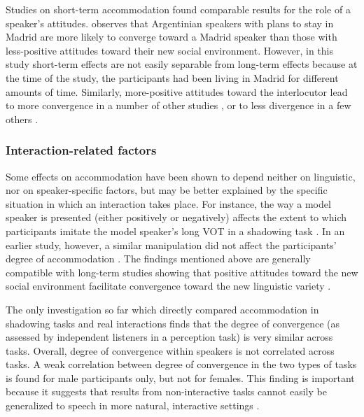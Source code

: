 \documentclass[output=paper,
modfonts
]{langscibook}
\begin{document}
Studies on short-term accommodation found comparable results for the role of a speaker's attitudes. \citet{macleod_effect_2012} observes that Argentinian speakers with plans to stay in Madrid are more likely to converge toward a Madrid speaker than those with less-positive attitudes toward their new social environment. However, in this study short-term effects are not easily separable from long-term effects because at the time of the study, the participants had been living in Madrid for different amounts of time. 
Similarly, more-positive attitudes toward the interlocutor lead to more convergence in a number of other studies \citep{yu_phonetic_2013,schweitzer_convergence_2013,babel_dialect_2010,babel_evidence_2012}, or to less divergence in a few others \citep{schweitzer_social_2014}. 



\subsubsection{Interaction-related factors}

Some effects on accommodation have been shown to depend neither on linguistic, nor on speaker-specific factors, but may be better explained by the specific situation in which an interaction takes place. 
For instance, the way a model speaker is presented (either positively or negatively) affects the extent to which participants imitate the model speaker's long VOT in a shadowing task \citep{yu_phonetic_2013}. In an earlier study, however, a similar manipulation did not affect the participants' degree of accommodation \citep{babel_dialect_2010}. The findings mentioned above are generally compatible with long-term studies showing that  positive attitudes toward the new social environment facilitate convergence toward the new linguistic variety \citep{werlen_zwischen_2006,macleod_effect_2012,pardo_phonetic_2012}.
% 
% 
% 

The only investigation so far which directly compared accommodation in shadowing tasks and real interactions \citep{pardo_comparison_2018} finds that the degree of convergence (as assessed by independent listeners in a perception task) is very similar across tasks. Overall, degree of convergence within speakers is not correlated across tasks. A weak correlation between degree of convergence in the two types of tasks is found for male participants only, but not for females. This finding is important because it suggests that results from non-interactive tasks cannot easily be generalized to speech in more natural, interactive settings \citep{pardo_comparison_2018}. 
% 
% 
% 
% 
% 
% 
\end{document}

